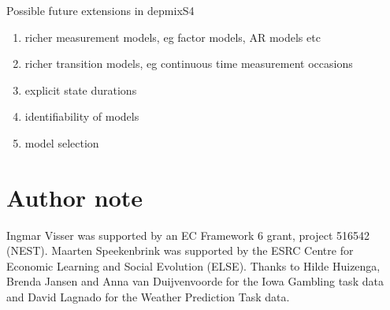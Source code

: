 \documentclass[a4paper,12pt,man]{apa} %
\begin{document}
Possible future extensions in depmixS4
\begin{enumerate}
	\item richer measurement models, eg factor models, AR models etc
	\item richer transition models, eg continuous time measurement occasions
	\item explicit state durations
	\item identifiability of models
	\item model selection
\end{enumerate}





\section*{Author note}

Ingmar Visser was supported by an EC Framework 6 grant, project 516542
(NEST).  Maarten Speekenbrink was supported by the ESRC Centre for
Economic Learning and Social Evolution (ELSE).  Thanks to Hilde
Huizenga, Brenda Jansen and Anna van Duijvenvoorde for the Iowa
Gambling task data and David Lagnado for the Weather Prediction Task
data.


\end{document}
